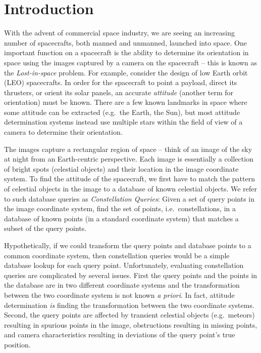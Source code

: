 \newcommand{\imageset}{\texttt{IMG}}
\newcommand{\databaseset}{\texttt{DB}}
\newcommand{\imagesubset}{b}
\newcommand{\databasesubset}{R}
\newcommand{\candidateset}{r}
\newcommand{\solutionmap}{h}

\newcommand{\genericdatabase}{\texttt{X\_DB}}
\newcommand{\angdatabase}{\texttt{ANG\_DB}}
\newcommand{\dotdatabase}{\texttt{DOT\_DB}}
\newcommand{\intdatabase}{\texttt{INT\_DB}}
\newcommand{\sphdatabase}{\texttt{SPH\_DB}}
\newcommand{\plndatabase}{\texttt{PLN\_DB}}
\newcommand{\pyrdatabase}{\texttt{PYR\_DB}}
\newcommand{\comdatabase}{\texttt{COM\_DB}}

\section{Introduction}\label{sec:introduction}
With the advent of commercial space industry, we are seeing an increasing number of spacecrafts, both manned and unmanned, launched into space.
One important function on a spacecraft is the ability to determine its orientation in space using the images captured by a camera on the spacecraft -- this is known as the \textit{Lost-in-space} problem.
For example, consider the design of low Earth orbit (LEO) spacecrafts.
In order for the spacecraft to point a payload, direct its thrusters, or orient its solar panels, an accurate \textit{attitude} (another term for orientation) must be known.
There are a few known landmarks in space where some attitude can be extracted (e.g.\ the Earth, the Sun), but most attitude determination systems instead use multiple stars within the field of view of a camera to determine their orientation.

The images capture a rectangular region of space -- think of an image of the sky at night from an Earth-centric perspective.
Each image is essentially a collection of bright spots (celestial objects) and their location in the image coordinate system.
To find the attitude of the spacecraft, we first have to match the pattern of celestial objects in the image to a database of known celestial objects.
We refer to such database queries as \textit{Constellation Queries}:
Given a set of query points in the image coordinate system, find the set of points, i.e.\ constellations, in a database of known points (in a standard coordinate system) that matches a subset of the query points.

Hypothetically, if we could transform the query points and database points to a common coordinate system, then constellation queries would be a simple database lookup for each query point.
Unfortunately, evaluating constellation queries are complicated by several issues. 
First the query points and the points in the database are in two different coordinate systems and the transformation between the two coordinate system is not known \emph{a priori}.
In fact, attitude determination \emph{is} finding the transformation between the two coordinate systems.
Second, the query points are affected by transient celestial objects (e.g.\ meteors) resulting in spurious points in the image, obstructions resulting in missing points, and camera characteristics resulting in deviations of the query point's true position.

